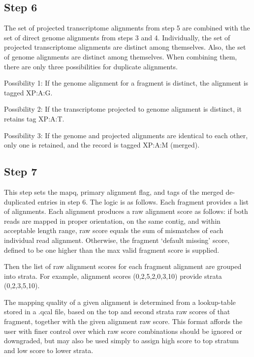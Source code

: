 \documentclass[10pt]{article}
\begin{document}
\subsection*{Step 6}

The set of projected transcriptome alignments from step 5 are combined
with the set of direct genome alignments from steps 3 and
4. Individually, the set of projected transcriptome alignments are
distinct among themselves. Also, the set of genome alignments are
distinct among themselves. When combining them, there are only three
possibilities for duplicate alignments.

Possibility 1: If the genome alignment for a fragment is distinct, the
alignment is tagged XP:A:G.

Possibility 2: If the transcriptome projected to genome alignment is
distinct, it retains tag XP:A:T.

Possibility 3: If the genome and projected alignments are identical to
each other, only one is retained, and the record is tagged XP:A:M
(merged).



\subsection*{Step 7}

This step sets the mapq, primary alignment flag, and tags of the
merged de-duplicated entries in step 6. The logic is as follows. Each
fragment provides a list of alignments. Each alignment produces a raw
alignment score as follows: if both reads are mapped in proper
orientation, on the same contig, and within acceptable length range,
raw score equals the sum of mismatches of each individual read
alignment. Otherwise, the fragment `default missing' score, defined to
be one higher than the max valid fragment score is supplied.

Then the list of raw alignment scores for each fragment alignment are
grouped into strata. For example, alignment scores (0,2,5,2,0,3,10)
provide strata (0,2,3,5,10).

The mapping quality of a given alignment is determined from a
lookup-table stored in a .qcal file, based on the top and second
strata raw scores of that fragment, together with the given alignment
raw score. This format affords the user with finer control over which
raw score combinations should be ignored or downgraded, but may also
be used simply to assign high score to top stratum and low score to
lower strata.
\end{document}
